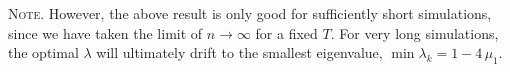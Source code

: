 \documentclass[reprint, floatfix]{revtex4-1}
\newcommand{\note}[1]{{\color{DarkGreen}\footnotesize \textsc{Note.} #1}}
\begin{document}
\note{
However, the above result %
is only good
for sufficiently short simulations,
since we have taken the limit of $n \to \infty$
for a fixed $T$.
%
For very long simulations,
the optimal $\lambda$
will ultimately drift to
the smallest eigenvalue,
$\min \lambda_k = 1 - 4 \, \mu_1$.
}




\end{document}

